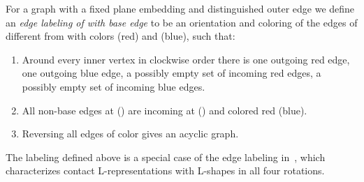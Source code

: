\documentclass{llncs}
\begin{document}
For a graph  with a fixed plane embedding and distinguished outer edge  we define an \emph{edge labeling of  with base edge } to be an orientation and coloring of the edges of  different from  with colors  (red) and  (blue), such that:
\begin{enumerate}[label = (\roman*)]
 \item Around every inner vertex  in clockwise order there is one outgoing red edge, one outgoing blue edge, a possibly empty set of incoming red edges, a possibly empty set of incoming blue edges.
 \item All non-base edges at  () are incoming at  () and colored red (blue).\item Reversing all edges of color  gives an acyclic graph.
\end{enumerate}

\noindent
The labeling defined above is a special case of the edge labeling in~\cite{full}, which characterizes contact L-representations with L-shapes in all four rotations.
\end{document}
